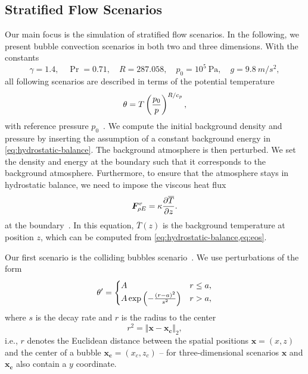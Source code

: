\documentclass[runningheads]{llncs}
\begin{document}
\subsection{Stratified Flow Scenarios}
Our main focus is the simulation of stratified flow scenarios.
In the following, we present bubble convection scenarios in both two and three dimensions.
With the constants
\begin{equation}\label{eq:atmosphere-constants}
    \gamma = 1.4 ,\quad \Pr =  0.71 ,\quad R = 287.058 ,\quad p_0 = 10^5 \SI{}{\Pa}, \quad g = \SI{9.8}{m/s^2},
\end{equation}
all following scenarios are described in terms of the potential temperature
\begin{equation}
  \theta = T \left( \frac{p_0}{p} \right)^{R/c_p},
\end{equation}
with reference pressure $p_0$~\cite{muller2010adaptive,giraldo2008study}.
%
We compute the initial background density and pressure by inserting the assumption of a constant background energy in \cref{eq:hydrostatic-balance}.
The background atmosphere is then perturbed.
We set the density and energy at the boundary such that it corresponds to the background atmosphere.
Furthermore, to ensure that the atmosphere stays in hydrostatic balance, we need to impose the viscous heat flux
\begin{equation}
  \label{eq:atmosphere-bc}
  \viscFlux_{\QE} = \kappa \pdv{\overline{T}}{z}.%
\end{equation}
at the boundary~\cite{giraldo2008study}.
In this equation, $\overline{T}(z)$ is the background temperature at position $z$, which can be computed from \cref{eq:hydrostatic-balance,eq:eos}.

Our first scenario is the colliding bubbles scenario~\cite{muller2010adaptive}.
We use perturbations of the form
\begin{equation}
  \label{eq:bubbles-pertubation}
  \theta' =
  \begin{cases}
    A & r \leq a, \\
    A \exp \left( - \frac{(r-a)^2}{s^2} \right) & r > a,
    \end{cases}
\end{equation}
where $s$ is the decay rate and $r$  is the radius to the center
\begin{equation}
  \label{eq:radius}
  r^2 = \Vert \bm{x} - \bm{x_c} \Vert_2,
\end{equation}
i.e., $r$ denotes the Euclidean distance between the spatial positions $\bm{x} = (x, z)$ and the center of a bubble $\bm{x_c} = (x_c, z_c)$ -- for three-dimensional scenarios $\bm{x}$ and $\bm{x_c}$ also contain a $y$ coordinate.
\end{document}
